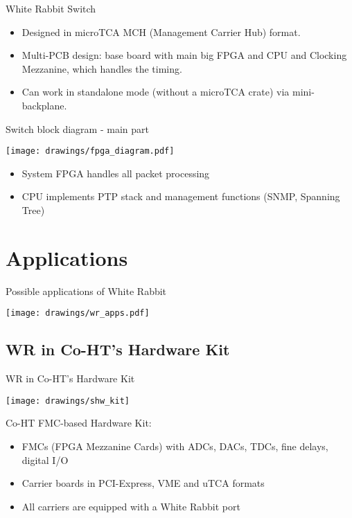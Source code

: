 \documentclass[xcolor=dvipsnames]{beamer}
\begin{document}
\begin{frame}{White Rabbit Switch}
\begin{itemize}
\item Designed in microTCA MCH (Management Carrier Hub) format.
\item Multi-PCB design: base board with main big FPGA and CPU and Clocking Mezzanine, which handles the timing.
\item Can work in standalone mode (without a microTCA crate) via mini-backplane.
\end{itemize}
\end{frame}

\begin{frame}{Switch block diagram - main part}
\begin{center}
\texttt{[image: drawings/fpga\_diagram.pdf]}
\end{center}
\begin{itemize}
\item System FPGA handles all packet processing
\item CPU implements PTP stack and management functions (SNMP, Spanning Tree)
\end{itemize}
\end{frame}

\section{Applications}

\begin{frame}{Possible applications of White Rabbit}
\begin{center}
\texttt{[image: drawings/wr\_apps.pdf]}
\end{center}
\end{frame}


\subsection{WR in Co-HT's Hardware Kit}
\begin{frame}{WR in Co-HT's Hardware Kit}
\begin{center}

  \texttt{[image: drawings/shw\_kit]}

  \begin{block}{Co-HT FMC-based Hardware Kit:}
    \begin{itemize}
    \item FMCs (FPGA Mezzanine Cards) with ADCs, DACs, TDCs, fine delays, digital I/O
    \item Carrier boards in PCI-Express, VME and uTCA formats
    \item All carriers are equipped with a White Rabbit port
    \end{itemize}
  \end{block}

\end{center}
\end{frame}
\end{document}
